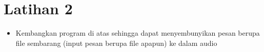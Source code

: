 \documentclass{article}
\begin{document}

\section*{Latihan 2}

\begin{itemize}
    \item Kembangkan program di atas sehingga dapat menyembunyikan pesan berupa file sembarang (input pesan berupa file apapun) ke dalam audio
\end{itemize}
\end{document}
